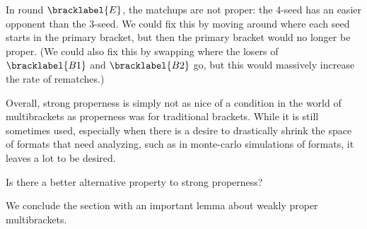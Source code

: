 {    

    In round $\bracklabel{E}$, the matchups are not proper: the 4-seed has an easier opponent than the 3-seed. We could fix this by moving around where each seed starts in the primary bracket, but then the primary bracket would no longer be proper. (We could also fix this by swapping where the losers of $\bracklabel{B1}$ and $\bracklabel{B2}$ go, but this would massively increase the rate of rematches.)

    Overall, strong properness is simply not as nice of a condition in the world of multibrackets as properness was for traditional brackets. While it is still sometimes used, especially when there is a desire to drastically shrink the space of formats that need analyzing, such as in monte-carlo simulations of formats, it leaves a lot to be desired.

    \begin{oq}{}{}
        Is there a better alternative property to strong properness?
    \end{oq}

    We conclude the section with an important lemma about weakly proper multibrackets.


}
